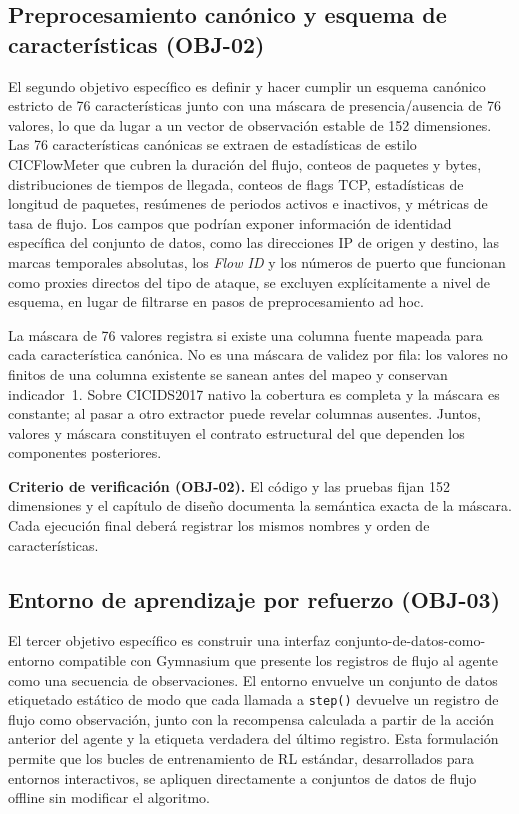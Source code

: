 \subsection{Preprocesamiento canónico y esquema de características (OBJ-02)}
El segundo objetivo específico es definir y hacer cumplir un esquema canónico estricto de 76 características junto con una máscara de presencia/ausencia de 76 valores, lo que da lugar a un vector de observación estable de 152 dimensiones. Las 76 características canónicas se extraen de estadísticas de estilo CICFlowMeter que cubren la duración del flujo, conteos de paquetes y bytes, distribuciones de tiempos de llegada, conteos de flags TCP, estadísticas de longitud de paquetes, resúmenes de periodos activos e inactivos, y métricas de tasa de flujo. Los campos que podrían exponer información de identidad específica del conjunto de datos, como las direcciones IP de origen y destino, las marcas temporales absolutas, los \textit{Flow ID} y los números de puerto que funcionan como proxies directos del tipo de ataque, se excluyen explícitamente a nivel de esquema, en lugar de filtrarse en pasos de preprocesamiento ad hoc.

La máscara de 76 valores registra si existe una columna fuente mapeada para cada característica canónica. No es una máscara de validez por fila: los valores no finitos de una columna existente se sanean antes del mapeo y conservan indicador~1. Sobre CICIDS2017 nativo la cobertura es completa y la máscara es constante; al pasar a otro extractor puede revelar columnas ausentes. Juntos, valores y máscara constituyen el contrato estructural del que dependen los componentes posteriores.

\textbf{Criterio de verificación (OBJ-02).} El código y las pruebas fijan 152 dimensiones y el capítulo de diseño documenta la semántica exacta de la máscara. Cada ejecución final deberá registrar los mismos nombres y orden de características.

\subsection{Entorno de aprendizaje por refuerzo (OBJ-03)}
El tercer objetivo específico es construir una interfaz conjunto-de-datos-como-entorno compatible con Gymnasium \parencite{GymnasiumDocs} que presente los registros de flujo al agente como una secuencia de observaciones. El entorno envuelve un conjunto de datos etiquetado estático de modo que cada llamada a \texttt{step()} devuelve un registro de flujo como observación, junto con la recompensa calculada a partir de la acción anterior del agente y la etiqueta verdadera del último registro. Esta formulación permite que los bucles de entrenamiento de RL estándar, desarrollados para entornos interactivos, se apliquen directamente a conjuntos de datos de flujo offline sin modificar el algoritmo.

